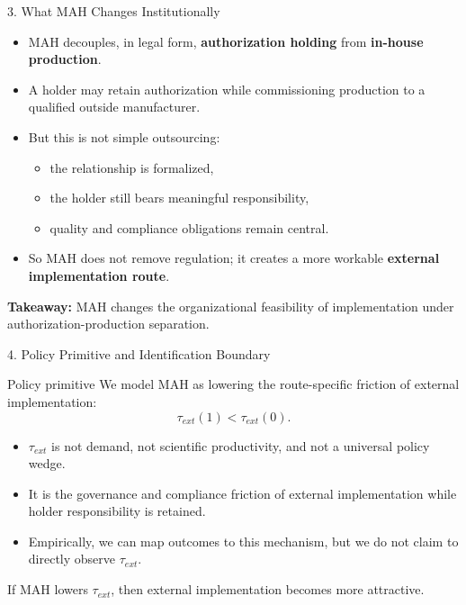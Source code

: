 \documentclass[aspectratio=169,11pt]{beamer}
\begin{document}
\begin{frame}{3. What MAH Changes Institutionally}
\begin{itemize}
    \item MAH decouples, in legal form, \textbf{authorization holding} from \textbf{in-house production}.
    \item A holder may retain authorization while commissioning production to a qualified outside manufacturer.
    \item But this is not simple outsourcing:
    \begin{itemize}
        \item the relationship is formalized,
        \item the holder still bears meaningful responsibility,
        \item quality and compliance obligations remain central.
    \end{itemize}
    \item So MAH does not remove regulation; it creates a more workable \textbf{external implementation route}.
\end{itemize}

\vspace{0.3cm}
\textbf{Takeaway:} MAH changes the organizational feasibility of implementation under authorization-production separation.
\end{frame}

\begin{frame}{4. Policy Primitive and Identification Boundary}
\begin{block}{Policy primitive}
We model MAH as lowering the route-specific friction of external implementation:
\[
\tau_{ext}(1) < \tau_{ext}(0).
\]
\end{block}

\begin{itemize}
    \item \(\tau_{ext}\) is not demand, not scientific productivity, and not a universal policy wedge.
    \item It is the governance and compliance friction of external implementation while holder responsibility is retained.
    \item Empirically, we can map outcomes to this mechanism, but we do not claim to directly observe \(\tau_{ext}\).
\end{itemize}

\vspace{0.3cm}
If MAH lowers \(\tau_{ext}\), then external implementation becomes more attractive.
\end{frame}
\end{document}
